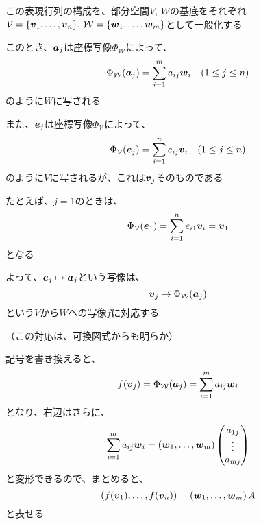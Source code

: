 \documentclass[../../../topic_linear-algebra]{subfiles}
\begin{document}
\br

この表現行列の構成を、部分空間$V,\,W$の基底をそれぞれ$\mathcal{V} = \{ \vb*{v}_1,\ldots, \vb*{v}_n\}, \, \mathcal{W} = \{\vb*{w}_1, \ldots, \vb*{w}_m\}$として一般化する

\br

このとき、$\vb*{a}_j$は座標写像$\Phi_{\mathcal{W}}$によって、
\begin{equation*}
  \Phi_{\mathcal{W}}(\vb*{a}_j) = \sum_{i=1}^m a_{ij} \vb*{w}_i \quad (1 \leq j \leq n)
\end{equation*}
のように$W$に写される

\br

また、$\vb*{e}_j$は座標写像$\Phi_{\mathcal{V}}$によって、
\begin{equation*}
  \Phi_{\mathcal{V}}(\vb*{e}_j) = \sum_{i=1}^n e_{ij} \vb*{v}_i \quad (1 \leq j \leq n)
\end{equation*}
のように$V$に写されるが、これは$\vb*{v}_j$そのものである

たとえば、$j=1$のときは、
\begin{equation*}
  \Phi_{\mathcal{V}}(\vb*{e}_1) = \sum_{i=1}^n e_{i1} \vb*{v}_i = \vb*{v}_1
\end{equation*}
となる

\br

よって、$\vb*{e}_j \mapsto \vb*{a}_j$という写像は、
\begin{equation*}
  \vb*{v}_j \mapsto \Phi_{\mathcal{W}}(\vb*{a}_j)
\end{equation*}
という$V$から$W$への写像$f$に対応する

（この対応は、可換図式からも明らか）

\br

記号を書き換えると、
\begin{equation*}
  f(\vb*{v}_j) = \Phi_{\mathcal{W}}(\vb*{a}_j) = \sum_{i=1}^m a_{ij} \vb*{w}_i
\end{equation*}
となり、右辺はさらに、
\begin{equation*}
  \sum_{i=1}^m a_{ij} \vb*{w}_i = (\vb*{w}_1, \ldots, \vb*{w}_m) \begin{pmatrix}
    a_{1j} \\
    \vdots \\
    a_{mj}
  \end{pmatrix}
\end{equation*}
と変形できるので、まとめると、
\begin{equation*}
  \left( f(\vb*{v}_1),\ldots, f(\vb*{v}_n) \right) = \left( \vb*{w}_1, \ldots, \vb*{w}_m \right) A
\end{equation*}
と表せる
\end{document}
